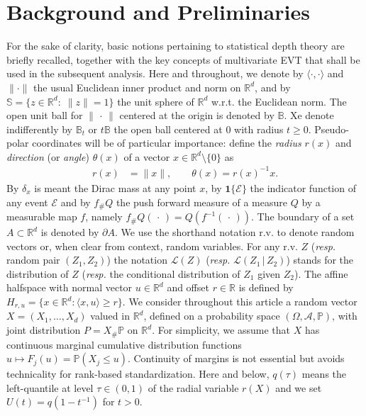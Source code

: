\documentclass{article}
\numberwithin{equation}{section}
\renewcommand{\P}{\mathbb{P}}
\newcommand{\rset}{\mathbb{R}}
\newcommand{\point}{\,\cdot\,}
\newcommand{\PP}{\P}%
\newcommand{\sphere}{\mathbb{S}}
\newcommand{\ball}{\mathbb{B}}
\begin{document}
\section{Background and Preliminaries}\label{sec:background}
%
For the sake of clarity, basic notions pertaining to statistical
depth theory are briefly recalled, together with the key concepts of
multivariate EVT that shall be used in the subsequent analysis. Here
and throughout, we denote by $\langle \cdot, \cdot \rangle$ and
$\| \cdot \|$ the usual Euclidean inner product and
norm on $\mathbb{R}^d$, and by $\sphere=\{ z\in
\mathbb{R}^d:\; \| z \|= 1 \}$ the unit sphere of
$\mathbb{R}^d$ w.r.t. the Euclidean norm.
The open unit ball for $\|\point\|$ centered at the origin is
denoted by $\ball$. Xe denote indifferently by $\ball_t$ or $t\ball$ the open ball centered at $0$ with radius $t\ge 0$. 
Pseudo-polar coordinates will be of particular importance:  define the \emph{radius} $r(x)$ and  \emph{direction} (or \emph{angle}) $\theta(x)$ of a vector $x\in\rset^d\setminus\{0\}$ as 
\begin{align*}
    r(x) & = \|x\|,  \qquad  \theta(x) =  r(x)^{-1} x.
\end{align*}
By $\delta_x$ is meant the
Dirac mass at any point $x$, by $\mathbf{1}\{\mathcal{E}\}$ the
indicator function of any event $\mathcal{E}$ and by $f_\# Q$ the push forward measure of a measure $Q$ by a measurable map $f$, namely $f_\#Q(\point) = Q(f^{-1}(\point))$. The boundary of a set $A\subset \rset^d$ is denoted by $\partial A$.  We use the shorthand notation r.v. to denote random vectors or, when clear from context, random variables.   For any r.v. $Z$
(\emph{resp.} random pair $(Z_1,Z_2)$) the notation  $\mathcal{L}(Z)$
(\emph{resp.} $\mathcal{L}(Z_1\,|\, Z_2)$) stands for the distribution
of $Z$ (\emph{resp.} the conditional distribution of $Z_1$ given $Z_2$).
The affine halfspace with normal vector $u\in\rset^d$ and offset
$r\in\rset$ is defined by
$H_{r,u} = \{x \in \rset^d: \langle x,u \rangle \ge  r \}.
$
We consider throughout this article a random vector $X = (X_1,\ldots, X_d)$  valued in $\rset^d$, defined on a probability space $(\Omega,\mathcal{A}, \PP)$,  with joint distribution $P= X_\# \mathbb{P}$ on $\rset^d$. 
For simplicity, we assume that $X$ has  continuous marginal cumulative distribution functions  $u\mapsto F_j(u) = \PP{(X_j \le u)}$. 
Continuity of margins is not essential but avoids technicality for rank-based standardization.  Here and below,
$q(\tau)$ means the left-quantile at level $\tau\in (0,1)$ of the
radial variable $r(X)$ and we set \(U(t)=q(1-t^{-1})\) for $t>0$.
\end{document}
